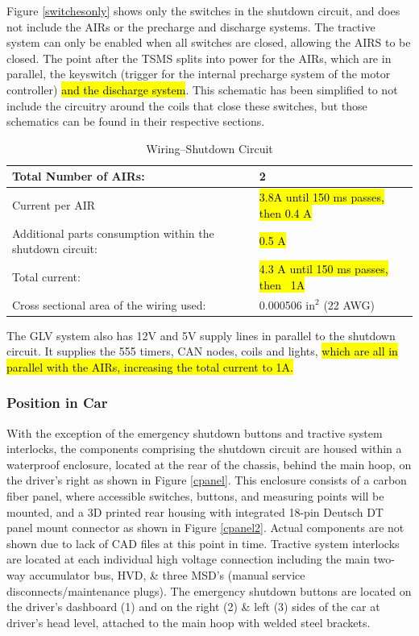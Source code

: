 \documentclass{article}
\DeclareRobustCommand{\hlr}[1]{{\sethlcolor{red}\hl{#1}}}
\begin{document}
            Figure \ref{switchesonly} shows only the switches in the shutdown circuit, and does not include the AIRs or the precharge and discharge systems. The tractive system can only be enabled when all switches are closed, allowing the AIRS to be closed. The point after the TSMS splits into power for the AIRs, which are in parallel, the keyswitch (trigger for the internal precharge system of the motor controller) \hlr{and the discharge system}. This schematic has been simplified to not include the circuitry around the coils that close these switches, but those schematics can be found in their respective sections.

            \begin{table}[H]
                \centering
                \begin{tabular}{|l|l|}
                \hline
                    Total Number of AIRs: & 2 \\ \hline
                    Current per AIR & \hlr{ 3.8A until 150 ms passes, then 0.4 A} \\ \hline
                    Additional parts consumption within the shutdown circuit: & \hlr{0.5 A }\\ \hline
                    Total current: & \hlr{4.3 A until 150 ms passes, then ~1A} \\ \hline
                    Cross sectional area of the wiring used: & 0.000506 in$^{2}$ (22 AWG) \\ \hline
                \end{tabular}
                \caption{Wiring--Shutdown Circuit}
                \label{ShutdownCircuitTable}
            \end{table}

            The GLV system also has 12V and 5V supply lines in parallel to the shutdown circuit. It supplies the 555 timers, CAN nodes, coils and lights, \hlr{ which are all in parallel with the AIRs, increasing the total current to 1A. }

        \subsubsection{Position in Car}

            With the exception of the emergency shutdown buttons and tractive system interlocks, the components comprising the shutdown circuit are housed within a waterproof enclosure, located at the rear of the chassis, behind the main hoop, on the driver's right as shown in Figure \ref{cpanel}. This enclosure consists of a carbon fiber panel, where accessible switches, buttons, and measuring points will be mounted, and a 3D printed rear housing with integrated 18-pin Deutsch DT panel mount connector as shown in Figure \ref{cpanel2}. Actual components are not shown due to lack of CAD files at this point in time. Tractive system interlocks are located at each individual high voltage connection including the main two-way accumulator bus, HVD, \& three MSD's (manual service disconnects/maintenance plugs). The emergency shutdown buttons are located on the driver's dashboard (1) and on the right (2) \& left (3) sides of the car at driver's head level, attached to the main hoop with welded steel brackets.
\end{document}
